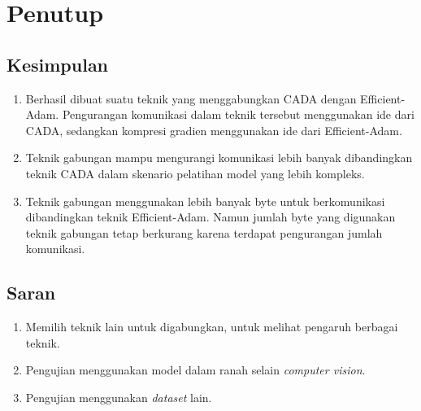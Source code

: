 \chapter{Penutup}

\section{Kesimpulan}
\begin{enumerate}
  \item Berhasil dibuat suatu teknik yang menggabungkan CADA dengan Efficient-Adam. Pengurangan komunikasi dalam teknik tersebut menggunakan ide dari CADA, sedangkan kompresi gradien menggunakan ide dari Efficient-Adam.
  \item Teknik gabungan mampu mengurangi komunikasi lebih banyak dibandingkan teknik CADA dalam skenario pelatihan model yang lebih kompleks.
  \item Teknik gabungan menggunakan lebih banyak byte untuk berkomunikasi dibandingkan teknik Efficient-Adam. Namun jumlah byte yang digunakan teknik gabungan tetap berkurang karena terdapat pengurangan jumlah komunikasi.
\end{enumerate}

\section{Saran}
\begin{enumerate}
  \item Memilih teknik lain untuk digabungkan, untuk melihat pengaruh berbagai teknik.
  \item Pengujian menggunakan model dalam ranah selain \emph{computer vision}.
  \item Pengujian menggunakan \emph{dataset} lain.
\end{enumerate}
